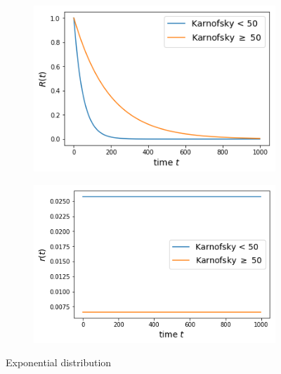 \documentclass[10pt]{article}
\begin{document}
      \begin{figure}[htb!]
\centering
    \begin{subfigure}{.4\linewidth}
    \centering
    \includegraphics[width=.99\textwidth]{Images/kar/Sexp.png}
  \end{subfigure}%
    \begin{subfigure}{.4\linewidth}
    \centering
    \includegraphics[width=.99\textwidth]{Images/kar/rexp.png}
  \end{subfigure}%
  \caption{Exponential distribution}\label{fig:karexp} 
   \end{figure}   
   
\end{document}
